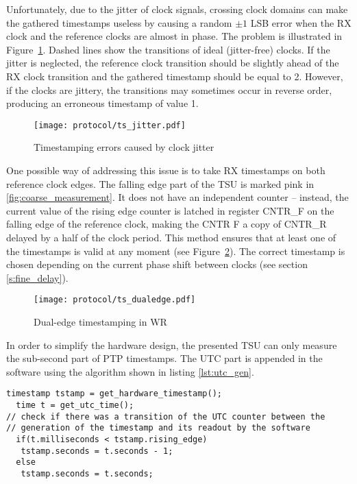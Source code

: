 Unfortunately, due to the jitter of clock signals, crossing clock domains
can make the gathered timestamps useless by causing a random $\pm 1$ LSB
error when the RX clock and the reference clocks are almost in phase. The
problem is illustrated in Figure~\ref{fig:ts_jitter}.  Dashed lines show
the transitions of ideal (jitter-free) clocks. If the jitter is neglected,
the reference clock transition should be slightly ahead of the RX clock
transition and the gathered timestamp should be equal to 2. However, if the
clocks are jittery, the transitions may sometimes occur in reverse order,
producing an erroneous timestamp of value 1.
\begin{figure}[ht!]
  \centering
  \texttt{[image: protocol/ts\_jitter.pdf]}
  \caption{Timestamping errors caused by clock jitter}
  \label{fig:ts_jitter}
\end{figure}
One possible way of addressing this issue is to take RX timestamps on both
reference clock edges. The falling edge part of the TSU is marked pink in
\ref{fig:coarse_measurement}. It does not have an independent counter --
instead, the current value of the rising edge counter is latched in register
CNTR\_F on the falling edge of the reference clock, making the CNTR\us
F a copy of CNTR\_R delayed by a half of the clock period. This method
ensures that at least one of the timestamps is valid at any moment 
(see Figure~\ref{fig:ts_dualedge}). The correct timestamp is chosen depending on the
current phase shift between clocks (see section \ref{s:fine_delay}).
\begin{figure}[ht!]
  \centering
  \texttt{[image: protocol/ts\_dualedge.pdf]}
  \caption{Dual-edge timestamping in WR}
  \label{fig:ts_dualedge}
\end{figure}
In order to simplify the hardware design, the presented TSU can only measure
the sub-second part of PTP timestamps. The UTC part is appended in the
software using the algorithm shown in listing \ref{lst:utc_gen}.
\begin{lstlisting}[caption=Producing UTC timestamps,label=lst:utc_gen]
  timestamp tstamp = get_hardware_timestamp();
  time t = get_utc_time();
// check if there was a transition of the UTC counter between the
// generation of the timestamp and its readout by the software
  if(t.milliseconds < tstamp.rising_edge)
   tstamp.seconds = t.seconds - 1;
  else
   tstamp.seconds = t.seconds;
\end{lstlisting}


